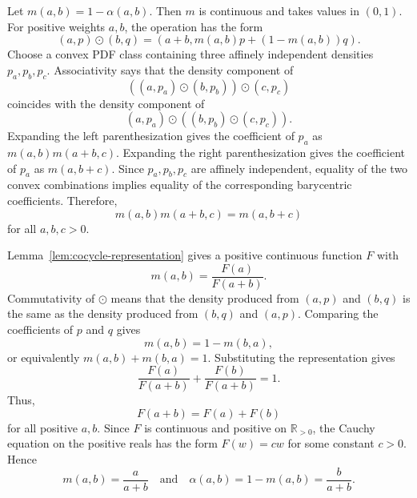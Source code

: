 \documentclass[runningheads]{llncs}
\newcommand{\R}{\mathbb{R}}
\begin{document}
Let $m(a,b)=1-\alpha(a,b)$. Then $m$ is continuous and takes values in $(0,1)$. For positive weights $a,b$, the operation has the form
\begin{equation*}
  (a,p)\odot(b,q)=(a+b,m(a,b)p+(1-m(a,b))q).
\end{equation*}
Choose a convex PDF class containing three affinely independent densities $p_a,p_b,p_c$. Associativity says that the density component of
\begin{equation*}
  ((a,p_a)\odot(b,p_b))\odot(c,p_c)
\end{equation*}
coincides with the density component of
\begin{equation*}
  (a,p_a)\odot((b,p_b)\odot(c,p_c)).
\end{equation*}
Expanding the left parenthesization gives the coefficient of $p_a$ as $m(a,b)m(a+b,c)$. Expanding the right parenthesization gives the coefficient of $p_a$ as $m(a,b+c)$. Since $p_a,p_b,p_c$ are affinely independent, equality of the two convex combinations implies equality of the corresponding barycentric coefficients. Therefore,
\begin{equation*}
  m(a,b)m(a+b,c)=m(a,b+c)
\end{equation*}
for all $a,b,c>0$.

Lemma~\ref{lem:cocycle-representation} gives a positive continuous function $F$ with
\begin{equation*}
  m(a,b)=\frac{F(a)}{F(a+b)}.
\end{equation*}
Commutativity of $\odot$ means that the density produced from $(a,p)$ and $(b,q)$ is the same as the density produced from $(b,q)$ and $(a,p)$. Comparing the coefficients of $p$ and $q$ gives
\begin{equation*}
  m(a,b)=1-m(b,a),
\end{equation*}
or equivalently $m(a,b)+m(b,a)=1$. Substituting the representation gives
\begin{equation*}
  \frac{F(a)}{F(a+b)}+\frac{F(b)}{F(a+b)}=1.
\end{equation*}
Thus,
\begin{equation*}
  F(a+b)=F(a)+F(b)
\end{equation*}
for all positive $a,b$. Since $F$ is continuous and positive on $\R_{>0}$, the Cauchy equation on the positive reals has the form $F(w)=cw$ for some constant $c>0$. Hence
\begin{equation*}
  m(a,b)=\frac{a}{a+b}
  \quad\text{and}\quad
  \alpha(a,b)=1-m(a,b)=\frac{b}{a+b}.
\end{equation*}
\end{document}
